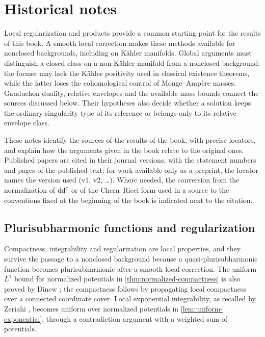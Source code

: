 \chapter{Historical notes}
\label{chap:history}

Local regularization and products provide a common starting point for the results of this book. A smooth local correction makes these methods available for nonclosed backgrounds, including on K\"ahler manifolds. Global arguments must distinguish a closed class on a non-K\"ahler manifold from a nonclosed background: the former may lack the K\"ahler positivity used in classical existence theorems, while the latter loses the cohomological control of Monge--Amp\`ere masses. Gauduchon duality, relative envelopes and the available mass bounds connect the sources discussed below. Their hypotheses also decide whether a solution keeps the ordinary singularity type of its reference or belongs only to its relative envelope class.

These notes identify the sources of the results of the book, with precise locators, and explain how the arguments given in the book relate to the original ones. Published papers are cited in their journal versions, with the statement numbers and pages of the published text; for work available only as a preprint, the locator names the version used (v1, v2, \dots). Where needed, the conversion from the normalization of $\mathrm{dd}^{\mathrm{c}}$ or of the Chern--Ricci form used in a source to the conventions fixed at the beginning of the book is indicated next to the citation.

\section{Plurisubharmonic functions and regularization}
\label{sec:history-psh}

Compactness, integrability and regularization are local properties, and they survive the passage to a nonclosed background because a quasi-plurisubharmonic function becomes plurisubharmonic after a smooth local correction. The uniform $L^1$ bound for normalized potentials in \cref{thm:normalized-compactness} is also proved by Dinew \cite[Proposition~6.2, p.~109]{Dinew16}; the compactness follows by propagating local compactness over a connected coordinate cover. Local exponential integrability, as recalled by Zeriahi \cite[Section~1, p.~672]{Zeriahi01}, becomes uniform over normalized potentials in \cref{lem:uniform-exponential}, through a contradiction argument with a weighted sum of potentials.

